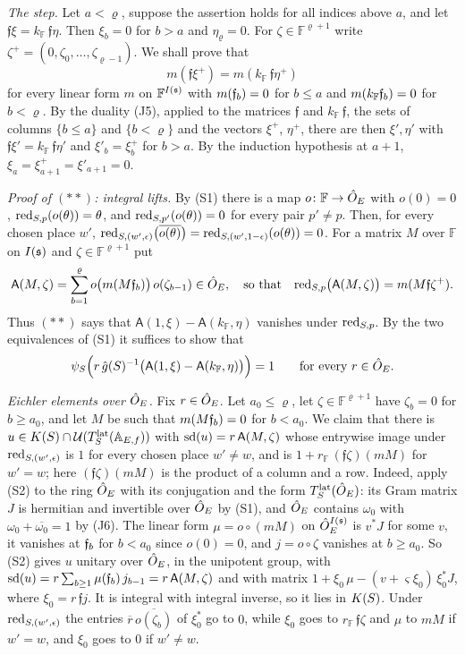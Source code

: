 \documentclass[11pt,a4paper]{article}
\makeatletter
\theoremstyle{plainx}
\theoremstyle{uprightx}
\renewenvironment{proof}[1][Proof]{\par\pushQED{\qed}\normalfont\topsep0pt\partopsep0pt
  \trivlist\item[\hskip\labelsep\itshape #1.]\ignorespaces}{\popQED\endtrivlist\@endpefalse}
\newcommand{\cj}[1]{\overline{#1}}
\newcommand{\rF}[1]{#1_{\mathbb{F}}}                       %
\makeatother
\begin{document}
\begin{proof}[Proof of Theorem A]
\emph{The step.} Let $a<\varrho$, suppose the assertion holds for all indices above $a$, and let
$\mathfrak f\xi=\rF{k}\,\mathfrak f\eta$. Then $\xi_b=0$ for $b>a$ and $\eta_\varrho=0$. For
$\zeta\in\mathbb F^{\varrho+1}$ write $\zeta^{+}=(0,\zeta_0,\dots,\zeta_{\varrho-1})$. We shall prove that
\[m(\mathfrak f\xi^{+})=m(\rF{k}\,\mathfrak f\eta^{+})\tag{$**$}\]
for every linear form $m$ on $\mathbb F^{I(\mathfrak{s})}$ with $m(\mathfrak{f}_{b})=0$ for $b\le a$ and $m(\rF{k}\fr{b})=0$ for
$b<\varrho$.
By the duality (J5), applied to the matrices $\mathfrak f$ and $\rF{k}\,\mathfrak f$, the sets of columns
$\{b\le a\}$ and $\{b<\varrho\}$ and the vectors $\xi^{+}$, $\eta^{+}$, there are then $\xi',\eta'$ with
$\mathfrak f\xi'=\rF{k}\,\mathfrak f\eta'$ and $\xi'_b=\xi^{+}_b$ for $b>a$. By the induction hypothesis at $a+1$,
$\xi_a=\xi^{+}_{a+1}=\xi'_{a+1}=0$.

\emph{Proof of $(**)$: integral lifts.} By (S1) there is a map $o\colon\mathbb F\to\hat{O}_E$ with $o(0)=0$,
$\mathrm{red}_{S,p}(o(\theta))=\theta$, and $\mathrm{red}_{S,p'}(o(\theta))=0$ for every pair $p'\ne p$. Then, for every chosen
place $w'$, $\rag{S}{(w',\epsilon)}\bigl(\cj{o(\theta)}\bigr)=\rag{S}{(w',1-\epsilon)}(o(\theta))=0$. For a matrix $M$
over $\mathbb F$ on $I(\mathfrak{s})$ and $\zeta\in\mathbb F^{\varrho+1}$ put
\[\mathsf A(M,\zeta)=\sum_{b=1}^{\varrho}o\bigl(m(M\mathfrak{f}_{b})\bigr)\,o(\zeta_{b-1})\in\hat{O}_E,\quad\text{so that}\quad
\mathrm{red}_{S,p}\bigl(\mathsf A(M,\zeta)\bigr)=m(M\mathfrak f\zeta^{+}).\]
Thus $(**)$ says that $\mathsf A(1,\xi)-\mathsf A(\rF{k},\eta)$ vanishes under $\mathrm{red}_{S,p}$. By the two
equivalences of (S1) it suffices to show that
\[\sdc{S}\Bigl(r\,\gid{S}^{-1}\bigl(\mathsf A(1,\xi)-\mathsf A(\rF{k},\eta)\bigr)\Bigr)=1\qquad\text{for every }r\in\hO.\]

\emph{Eichler elements over $\hat{O}_E$.} Fix $r\in\hat{O}_E$. Let $a_0\le\varrho$, let $\zeta\in\mathbb F^{\varrho+1}$ have
$\zeta_b=0$ for $b\ge a_0$, and let $M$ be such that $m(M\mathfrak{f}_{b})=0$ for $b<a_0$. We claim that there is
$u\in K(S)\cap\mathcal{U}(T^{\mathrm{lat}}_{S}(\mathbb{A}_{E,f}))$ with $\operatorname{sd}(u)=r\,\mathsf A(M,\zeta)$ whose entrywise image under
$\mathrm{red}_{S,(w',\epsilon)}$ is $1$ for every chosen place $w'\ne w$, and is $1+\rF{r}\,(\mathfrak f\zeta)(mM)$ for
$w'=w$; here $(\mathfrak f\zeta)(mM)$ is the product of a column and a row. Indeed, apply (S2) to the ring $\hat{O}_E$
with its conjugation and the form $T^{\mathrm{lat}}_{S}(\hat{O}_E)$: its Gram matrix $J$ is hermitian and invertible over $\hat{O}_E$ by
(S1), and $\hat{O}_E$ contains $\omega_0$ with $\omega_0+\cj{\omega_0}=1$ by (J6). The linear form
$\mu=o\circ(mM)$ on $\hat{O}_E^{I(\mathfrak{s})}$ is $v^{*}J$ for some $v$, it vanishes at $\mathfrak{f}_{b}$ for $b<a_0$ since $o(0)=0$,
and $j=o\circ\zeta$ vanishes at $b\ge a_0$. So (S2) gives $u$ unitary over $\hat{O}_E$, in the unipotent group, with
$\operatorname{sd}(u)=r\sum_{b\ge1}\mu(\mathfrak{f}_{b})\,j_{b-1}=r\,\mathsf A(M,\zeta)$ and with matrix
$1+\xi_0\,\mu-(v+\varsigma\xi_0)\,\xi_0^{*}J$, where $\xi_0=r\,\mathfrak f j$. It is integral with integral inverse,
so it lies in $K(S)$. Under $\mathrm{red}_{S,(w',\epsilon)}$ the entries $\cj{r}\,\cj{o(\zeta_b)}$ of $\xi_0^{*}$ go to $0$,
while $\xi_0$ goes to $\rF{r}\,\mathfrak f\zeta$ and $\mu$ to $mM$ if $w'=w$, and $\xi_0$ goes to $0$ if $w'\ne w$.


\end{proof}
\end{document}
